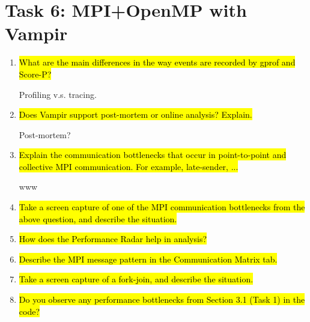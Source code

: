 \documentclass{article}
\begin{document}
\section{Task 6: MPI+OpenMP with Vampir}
\begin{enumerate}
	\item \hl{What are the main differences in the way events are recorded by gprof and Score-P?} ~

	Profiling v.s. tracing.

	\item \hl{Does Vampir support post-mortem or online analysis? Explain.} ~

	Post-mortem?

	\item \hl{Explain the communication bottlenecks that occur in point-to-point and collective MPI communication. For example, late-sender, ...} ~

	www

	\item \hl{Take a screen capture of one of the MPI communication bottlenecks from the above question, and describe the situation.} ~

	\item \hl{How does the Performance Radar help in analysis?} ~

	\item \hl{Describe the MPI message pattern in the Communication Matrix tab.} ~

	\item \hl{Take a screen capture of a fork-join, and describe the situation.} ~

	\item \hl{Do you observe any performance bottlenecks from Section 3.1 (Task 1) in the code?} ~
\end{enumerate}

\end{document}
